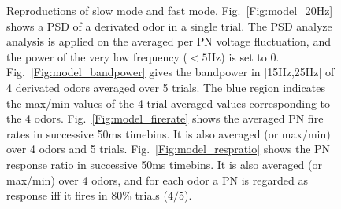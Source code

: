 \documentclass[12pt, a4paper]{article}
\begin{document}
\begin{figure}[htbp]\centering
{}
\hspace{0.5cm}
\hspace{0.5cm}
\hspace{0.5cm}
\vspace{-2mm}
\caption[short~Title~Here]{\label{Fig:model} \small Reproductions of slow mode and fast mode. Fig.~\ref{Fig:model_20Hz} shows a PSD of a derivated odor in a single trial. The PSD analyze analysis is applied on the averaged per PN voltage fluctuation, and the power of the very low frequency ($<5$Hz) is set to 0. Fig.~\ref{Fig:model_bandpower} gives the bandpower in {[15Hz,25Hz]} of 4 derivated odors averaged over 5 trials. The blue region indicates the max/min values of the 4 trial-averaged values corresponding to the 4 odors. Fig.~\ref{Fig:model_firerate} shows the averaged PN fire rates in successive 50ms timebins. It is also averaged (or max/min) over 4 odors and 5 trials. Fig.~\ref{Fig:model_respratio} shows the PN response ratio in successive 50ms timebins. It is also averaged (or max/min) over 4 odors, and for each odor a PN is regarded as response iff it fires in 80\% trials ($4/5$).}
\end{figure}
\end{document}
